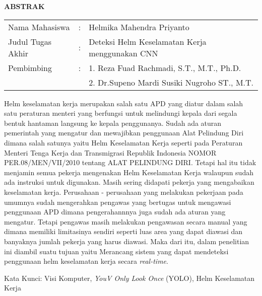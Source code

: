 \begin{center}
  \large\textbf{ABSTRAK}
\end{center}


\vspace{2ex}

\begingroup
  \setlength{\tabcolsep}{0pt}

  \noindent
  \begin{tabularx}{\textwidth}{l >{\centering}m{2em} X}
    Nama Mahasiswa    &:& Helmika Mahendra Priyanto \\

    Judul Tugas Akhir &:&	Deteksi Helm Keselamatan Kerja menggunakan CNN \\

    Pembimbing        &:& 1. Reza Fuad Rachmadi, S.T., M.T., Ph.D. \\
                      & & 2. Dr.Supeno Mardi Susiki Nugroho ST., M.T. \\
  \end{tabularx}
\endgroup

Helm keselamatan kerja merupakan salah satu APD yang diatur dalam salah satu peraturan menteri yang berfungsi untuk melindungi kepala dari segala bentuk hantaman langsung ke kepala penggunanya. Sudah ada aturan pemerintah yang mengatur dan mewajibkan penggunaan Alat Pelindung Diri dimana salah satunya yaitu Helm Keselamatan Kerja seperti pada Peraturan Menteri Tenga Kerja dan Transmigrasi Republik Indonesia NOMOR PER.08/MEN/VII/2010 tentang ALAT PELINDUNG DIRI. Tetapi hal itu tidak menjamin semua pekerja mengenakan Helm Keselamatan Kerja walaupun sudah ada instruksi untuk digunakan. Masih sering didapati pekerja yang mengabaikan keselamatan kerja. Perusahaan - perusahaan yang melakukan pekerjaan pada umumnya sudah mengerahkan pengawas yang bertugas untuk mengawasi penggunaan APD dimana pengerahannnya juga sudah ada aturan yang mengatur. Tetapi pengawas masih melakukan pengawasan secara manual yang dimana memiliki limitasinya sendiri seperti luas area yang dapat diawasi dan banyaknya jumlah pekerja yang harus diawasi. Maka dari itu, dalam penelitian ini diambil suatu tujuan yaitu Merancang sistem yang dapat mendeteksi penggunaan helm keselamatan kerja secara \emph{real-time}. 

Kata Kunci: Visi Komputer, \emph{YouV Only Look Once} (YOLO), Helm Keselamatan Kerja
